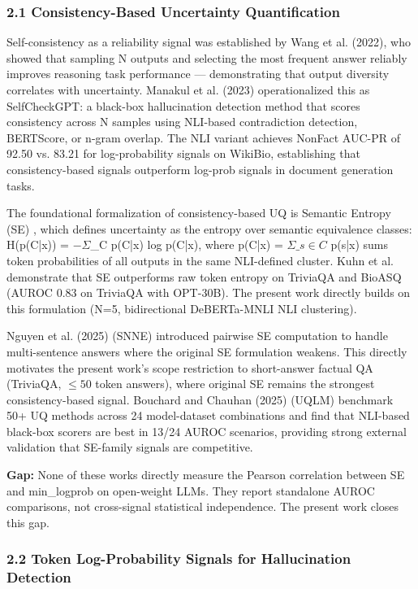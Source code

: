 
\subsubsection{2.1 Consistency-Based Uncertainty Quantification}

Self-consistency as a reliability signal was established by Wang et al. (2022), who showed that sampling N outputs and selecting the most frequent answer reliably improves reasoning task performance --- demonstrating that output diversity correlates with uncertainty. Manakul et al. (2023) operationalized this as SelfCheckGPT: a black-box hallucination detection method that scores consistency across N samples using NLI-based contradiction detection, BERTScore, or n-gram overlap. The NLI variant achieves NonFact AUC-PR of 92.50 vs. 83.21 for log-probability signals on WikiBio, establishing that consistency-based signals outperform log-prob signals in document generation tasks.

The foundational formalization of consistency-based UQ is Semantic Entropy (SE) \citep{Kuhn2023Semantic}, which defines uncertainty as the entropy over semantic equivalence classes: H(p(C|x)) = $-\Sigma$\_C p(C|x) log p(C|x), where p(C|x) = $\Sigma\_{s\in C}$ p(s|x) sums token probabilities of all outputs in the same NLI-defined cluster. Kuhn et al. demonstrate that SE outperforms raw token entropy on TriviaQA and BioASQ (AUROC 0.83 on TriviaQA with OPT-30B). The present work directly builds on this formulation (N=5, bidirectional DeBERTa-MNLI NLI clustering).

Nguyen et al. (2025) (SNNE) introduced pairwise SE computation to handle multi-sentence answers where the original SE formulation weakens. This directly motivates the present work's scope restriction to short-answer factual QA (TriviaQA, $\leq 50$ token answers), where original SE remains the strongest consistency-based signal. Bouchard and Chauhan (2025) (UQLM) benchmark 50+ UQ methods across 24 model-dataset combinations and find that NLI-based black-box scorers are best in 13/24 AUROC scenarios, providing strong external validation that SE-family signals are competitive.

\textbf{Gap:} None of these works directly measure the Pearson correlation between SE and min\_logprob on open-weight LLMs. They report standalone AUROC comparisons, not cross-signal statistical independence. The present work closes this gap.

\subsubsection{2.2 Token Log-Probability Signals for Hallucination Detection}

